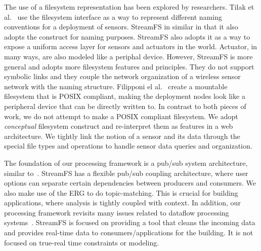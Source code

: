 The use of a filesystem representation has been explored by researchers.  Tilak et al.~\cite{BingFS} use the filesystem 
interface as a way to represent different naming conventions for a deployment of sensors.	StreamFS in similar in that it also 
adopts the construct for naming purposes.  StreamFS also adopts it as a way to expose a uniform access layer for sensors and
actuators in the world.  Actuator, in many ways, are also modeled like a periphal device.
However, StreamFS is more general and adopts more filesystem features and principles.
They do not support symbolic links and they couple the network organization of a wireless sensor network with the naming structure.
Filipponi el al.~\cite{wsnfuse} create a mountable filesystem that is POSIX compliant, making the deployment nodes
look like a peripheral device that can be directly written to.  In contrast to both pieces of work, we do not attempt
to make a POSIX compliant filesystem.  We adopt \emph{conceptual} filesystem construct and re-interpret them as features in 
a web architecture.  We tightly link the notion of a sensor and its data through the special file types and operations to 
handle sensor data queries and organization.




The foundation of our processing framework is a pub/sub system architecture, similar 
to~\cite{Eugster01contentbasedpubsub, Rosenblum97adesign, tspaces, tibco}.  StreamFS has a flexible pub/sub coupling architecture,
where user options can separate certain dependencies between producers and consumers.  We also make use of the ERG to 
do topic-matching.  This is crucial for building applications, where analysis is tightly coupled with context.
In addition, our processing framework revisits many issues related to dataflow processing systems~\cite{CullerCSD92716,ptolemy2001,ptolemy2007}.
StreamFS is focused on providing a tool that cleans the incoming data and provides real-time data to consumers/applications
for the building.  It is not focused on true-real time constraints or modeling.











